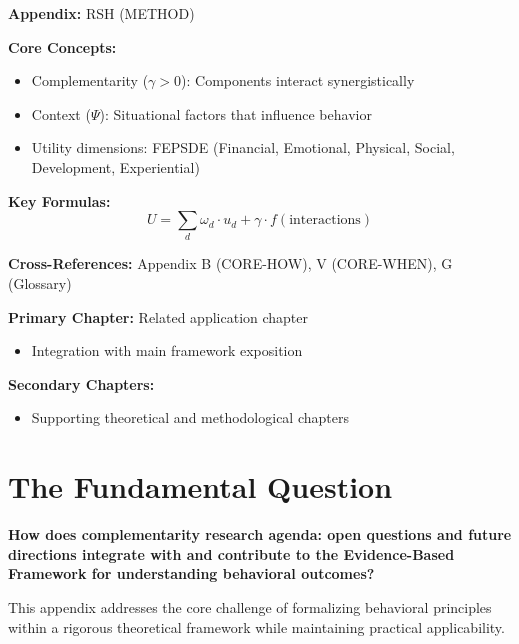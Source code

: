 \begin{tcolorbox}[colback=blue!5!white, colframe=blue!75!black,
    title=Quick Reference: Complementarity Research Agenda: Open Questions and Future Directions]

\textbf{Appendix:} RSH (METHOD)

\textbf{Core Concepts:}
\begin{itemize}[nosep]
\item Complementarity ($\gamma > 0$): Components interact synergistically
\item Context ($\Psi$): Situational factors that influence behavior
\item Utility dimensions: FEPSDE (Financial, Emotional, Physical, Social, Development, Experiential)
\end{itemize}

\textbf{Key Formulas:}
\begin{equation}
U = \sum_d \omega_d \cdot u_d + \gamma \cdot f(\text{interactions})
\end{equation}

\textbf{Cross-References:} Appendix B (CORE-HOW), V (CORE-WHEN), G (Glossary)
\end{tcolorbox}


\begin{tcolorbox}[colback=purple!5!white, colframe=purple!75!black,
    title=Chapter Linkage]

\textbf{Primary Chapter:} Related application chapter
\begin{itemize}[nosep]
\item Integration with main framework exposition
\end{itemize}

\textbf{Secondary Chapters:}
\begin{itemize}[nosep]
\item Supporting theoretical and methodological chapters
\end{itemize}

\end{tcolorbox}

\section{The Fundamental Question}
\label{sec:rsh-fundamental}

\begin{tcolorbox}[
    colback=red!5!white,
    colframe=red!75!black,
    title={\textbf{Fundamental Question}}
]
\textbf{How does complementarity research agenda: open questions and future directions integrate with and contribute to the
Evidence-Based Framework for understanding behavioral outcomes?}

This appendix addresses the core challenge of formalizing behavioral principles
within a rigorous theoretical framework while maintaining practical applicability.
\end{tcolorbox}







